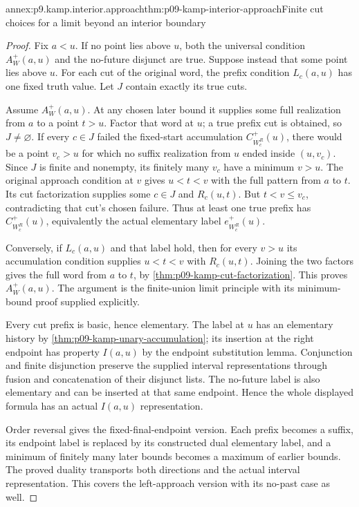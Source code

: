 \begin{annexitem}{annex:p9.kamp.interior.approach}{thm:p09-kamp-interior-approach}{Finite cut choices for a limit beyond an interior boundary}
\begin{proof}
Fix \(a<u\). If no point lies above \(u\), both the
universal condition \(A_W^+(a,u)\) and the no-future disjunct
are true. Suppose instead that some point lies above \(u\).
For each cut of the original word, the prefix condition \(L_c(a,u)\)
has one fixed truth value. Let \(J\) contain exactly its true cuts.

Assume \(A_W^+(a,u)\). At any chosen later bound it supplies
some full realization from \(a\) to a point \(t>u\).
Factor that word at \(u\); a true prefix cut is obtained,
so \(J\ne\varnothing\). If every \(c\in J\) failed
the fixed-start accumulation \(C_{W_c^R}^+(u)\), there
would be a point \(v_c>u\) for which no suffix realization
from \(u\) ended inside \((u,v_c)\). Since \(J\) is
finite and nonempty, its finitely many \(v_c\) have a minimum
\(v>u\). The original approach condition at \(v\) gives
\(u<t<v\) with the full pattern from \(a\) to \(t\).
Its cut factorization supplies some \(c\in J\) and
\(R_c(u,t)\). But \(t<v\leq v_c\), contradicting
that cut's chosen failure. Thus at least one true prefix has
\(C_{W_c^R}^+(u)\), equivalently the actual elementary
label \(e_{W_c^R}^+(u)\).

Conversely, if \(L_c(a,u)\) and that label hold, then for
every \(v>u\) its accumulation condition supplies
\(u<t<v\) with \(R_c(u,t)\). Joining the two factors
gives the full word from \(a\) to \(t\), by
\cref{thm:p09-kamp-cut-factorization}. This proves
\(A_W^+(a,u)\). The argument is the finite-union limit
principle with its minimum-bound proof supplied explicitly.

Every cut prefix is basic, hence elementary. The label at \(u\)
has an elementary history by
\cref{thm:p09-kamp-unary-accumulation}; its insertion at the
right endpoint has property \(I(a,u)\) by the endpoint
substitution lemma. Conjunction and finite disjunction preserve
the supplied interval representations through fusion and concatenation
of their disjunct lists. The no-future label is also elementary
and can be inserted at that same endpoint. Hence the whole displayed
formula has an actual \(I(a,u)\) representation.

Order reversal gives the fixed-final-endpoint version. Each prefix
becomes a suffix, its endpoint label is replaced by its constructed
dual elementary label, and a minimum of finitely many later bounds
becomes a maximum of earlier bounds. The proved duality transports
both directions and the actual interval representation. This covers
the left-approach version with its no-past case as well.
\end{proof}
\end{annexitem}

